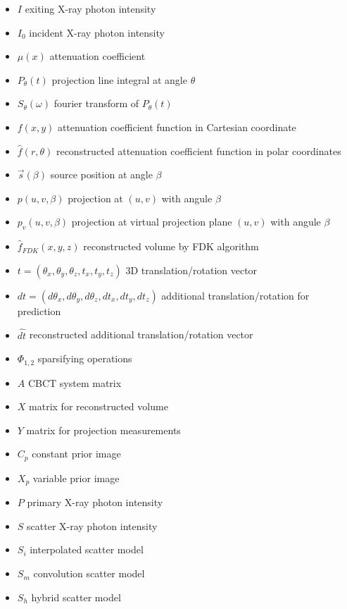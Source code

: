 \begin{itemize}
  \item[] $I$ exiting X-ray photon intensity
  \item[] $I_{0}$ incident X-ray photon intensity
  \item[] $\mu(x)$ attenuation coefficient
  \item[] $P_{\theta}(t)$ projection line integral at angle $\theta$
  \item[] $S_{\theta}(\omega)$ fourier transform of $P_{\theta}(t)$
  \item[] $f(x, y)$ attenuation coefficient function in Cartesian coordinate
  \item[] $\hat{f}(r, \theta)$ reconstructed attenuation coefficient function in polar coordinates
  \item[] $\vec{s} (\beta)$ source position at angle $\beta$
  \item[] $p(u, v, \beta)$ projection at $(u, v)$ with angule $\beta$
  \item[] $p_{v}(u, v, \beta)$ projection at virtual projection plane $(u, v)$ with angule $\beta$
  \item[] $\hat{f}_{FDK}(x, y, z)$ reconstructed volume by FDK algorithm
  \item[] $t=(\theta_{x}, \theta_{y}, \theta_{z}, t_{x}, t_{y}, t_{z})$ 3D translation/rotation vector
  \item[] $ dt=(d\theta_{x}, d\theta_{y}, d\theta_{z}, dt_{x}, dt_{y}, dt_{z})$ additional translation/rotation for prediction
  \item[] $\widehat{dt}$ reconstructed additional translation/rotation vector
  \item[] $\Phi_{1, 2}$ sparsifying operations
  \item[] $A$ CBCT system matrix
  \item[] $X$ matrix for reconstructed volume
  \item[] $Y$ matrix for projection measurements
  \item[] $C_{p}$ constant prior image
  \item[] $X_{p}$ variable prior image
  \item[] $P$ primary X-ray photon intensity
  \item[] $S$ scatter X-ray photon intensity
  \item[] $S_{i}$ interpolated scatter model
  \item[] $S_{m}$ convolution scatter model
  \item[] $S_{h}$ hybrid scatter model
 \end{itemize}

